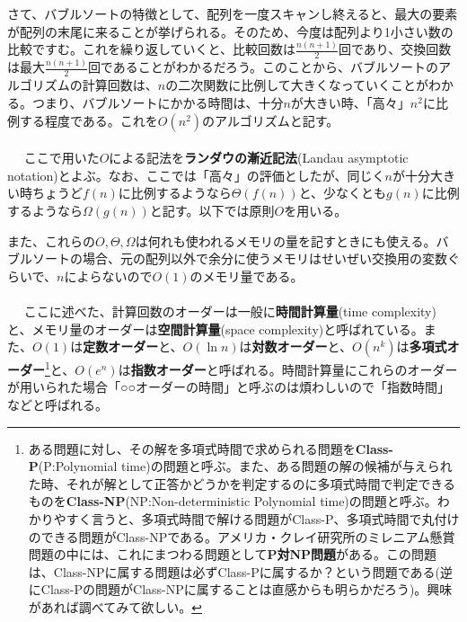 さて、バブルソートの特徴として、配列を一度スキャンし終えると、最大の要素が配列の末尾に来ることが挙げられる。そのため、今度は配列より1小さい数の比較ですむ。これを繰り返していくと、比較回数は$\frac{n(n+1)}{2}$回であり、交換回数は最大$\frac{n(n+1)}{2}$回であることがわかるだろう。このことから、バブルソートのアルゴリズムの計算回数は、$n$の二次関数に比例して大きくなっていくことがわかる。つまり、バブルソートにかかる時間は、十分$n$が大きい時、「高々」$n^2$に比例する程度である。これを$O(n^2)$のアルゴリズムと記す。
\\ \\　
ここで用いた$O$による記法を\textbf{ランダウの漸近記法}(Landau asymptotic notation)とよぶ。なお、ここでは「高々」の評価としたが、同じく$n$が十分大きい時ちょうど$f(n)$に比例するようなら$\Theta\left(f(n)\right)$と、少なくとも$g(n)$に比例するようなら$\Omega\left(g(n)\right)$と記す。以下では原則$O$を用いる。

また、これらの$O,\Theta,\Omega$は何れも使われるメモリの量を記すときにも使える。バブルソートの場合、元の配列以外で余分に使うメモリはせいぜい交換用の変数ぐらいで、$n$によらないので$O(1)$のメモリ量である。
\\ \\　
ここに述べた、計算回数のオーダーは一般に\textbf{時間計算量}(time complexity)と、メモリ量のオーダーは\textbf{空間計算量}(space complexity)と呼ばれている。また、$O(1)$は\textbf{定数オーダー}と、$O(\ln n)$は\textbf{対数オーダー}と、$O(n^k)$は\textbf{多項式オーダー}\footnote{ある問題に対し、その解を多項式時間で求められる問題を\textbf{Class-P}(P:Polynomial time)の問題と呼ぶ。また、ある問題の解の候補が与えられた時、それが解として正答かどうかを判定するのに多項式時間で判定できるものを\textbf{Class-NP}(NP:Non-deterministic Polynomial time)の問題と呼ぶ。わかりやすく言うと、多項式時間で解ける問題がClass-P、多項式時間で丸付けのできる問題がClass-NPである。アメリカ・クレイ研究所のミレニアム懸賞問題の中には、これにまつわる問題として\textbf{P対NP問題}がある。この問題は、Class-NPに属する問題は必ずClass-Pに属するか？という問題である(逆にClass-Pの問題がClass-NPに属することは直感からも明らかだろう)。興味があれば調べてみて欲しい。}と、$O(e^n)$は\textbf{指数オーダー}と呼ばれる。時間計算量にこれらのオーダーが用いられた場合「○○オーダーの時間」と呼ぶのは煩わしいので「指数時間」などと呼ばれる。

